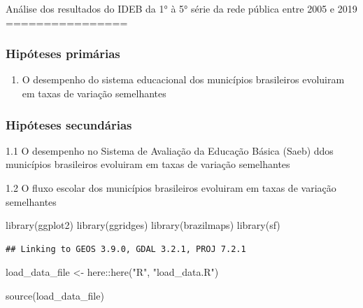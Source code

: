 \documentclass[
]{article}
\author{}
\date{\vspace{-2.5em}}
\newenvironment{Shaded}{\begin{snugshade}}{\end{snugshade}}
\newcommand{\FunctionTok}[1]{\textcolor[rgb]{0.00,0.00,0.00}{#1}}
\newcommand{\NormalTok}[1]{#1}
\newcommand{\OtherTok}[1]{\textcolor[rgb]{0.56,0.35,0.01}{#1}}
\newcommand{\SpecialCharTok}[1]{\textcolor[rgb]{0.00,0.00,0.00}{#1}}
\newcommand{\StringTok}[1]{\textcolor[rgb]{0.31,0.60,0.02}{#1}}
\providecommand{\tightlist}{%
  \setlength{\itemsep}{0pt}\setlength{\parskip}{0pt}}
\begin{document}
Análise dos resultados do IDEB da 1° à 5° série da rede pública entre
2005 e 2019 ================

\hypertarget{hipuxf3teses-primuxe1rias}{%
\subsubsection{Hipóteses primárias}\label{hipuxf3teses-primuxe1rias}}

\begin{enumerate}
\def\labelenumi{\arabic{enumi}.}
\tightlist
\item
  O desempenho do sistema educacional dos municípios brasileiros
  evoluiram em taxas de variação semelhantes
\end{enumerate}

\hypertarget{hipuxf3teses-secunduxe1rias}{%
\subsubsection{Hipóteses
secundárias}\label{hipuxf3teses-secunduxe1rias}}

1.1 O desempenho no Sistema de Avaliação da Educação Básica (Saeb) ddos
municípios brasileiros evoluiram em taxas de variação semelhantes

1.2 O fluxo escolar dos municípios brasileiros evoluiram em taxas de
variação semelhantes

\begin{Shaded}
\begin{Highlighting}[]
\FunctionTok{library}\NormalTok{(ggplot2)}
\FunctionTok{library}\NormalTok{(ggridges)}
\FunctionTok{library}\NormalTok{(brazilmaps)}
\FunctionTok{library}\NormalTok{(sf)}
\end{Highlighting}
\end{Shaded}

\begin{verbatim}
## Linking to GEOS 3.9.0, GDAL 3.2.1, PROJ 7.2.1
\end{verbatim}

\begin{Shaded}
\begin{Highlighting}[]
\NormalTok{load\_data\_file }\OtherTok{\textless{}{-}}\NormalTok{ here}\SpecialCharTok{::}\FunctionTok{here}\NormalTok{(}\StringTok{"R"}\NormalTok{, }\StringTok{"load\_data.R"}\NormalTok{)}

\FunctionTok{source}\NormalTok{(load\_data\_file)}
\end{Highlighting}
\end{Shaded}
\end{document}
